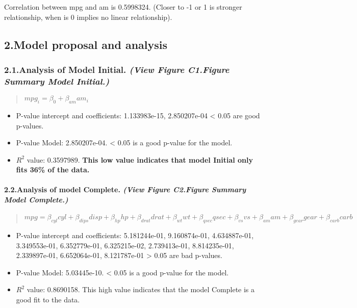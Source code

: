 \documentclass[11pt,]{article}
\begin{document}
Correlation between mpg and am is 0.5998324. (Closer to -1 or 1 is
stronger relationship, when is 0 implies no linear relationship).

\subsection{2.Model proposal and
analysis}\label{model-proposal-and-analysis}

\subsubsection{\texorpdfstring{2.1.Analysis of Model Initial.
\emph{(View Figure C1.Figure Summary Model
Initial.)}}{2.1.Analysis of Model Initial. (View Figure C1.Figure Summary Model Initial.)}}\label{analysis-of-model-initial.-view-figure-c1.figure-summary-model-initial.}

\begin{quote}
\(mpg_i={\beta}_0+\beta_{am}am_i\)
\end{quote}

\begin{itemize}
\itemsep1pt\parskip0pt
\item
  P-value intercept and coefficients: 1.133983e-15, 2.850207e-04
  \textless{} 0.05 are good p-values.
\item
  P-value Model: 2.850207e-04. \textless{} 0.05 is a good p-value for
  the model.
\item
  \(R^2\) value: 0.3597989. \textbf{This low value indicates that model
  Initial only fits 36\% of the data.}
\end{itemize}

\paragraph{\texorpdfstring{2.2.Analysis of model Complete. \emph{(View
Figure C2.Figure Summary Model
Complete.)}}{2.2.Analysis of model Complete. (View Figure C2.Figure Summary Model Complete.)}}\label{analysis-of-model-complete.-view-figure-c2.figure-summary-model-complete.}

\begin{quote}
\(mpg =\beta_{cyl}cyl+\beta_{dips}disp+\beta_{hp}hp+\beta_{drat}drat+\beta_{wt}wt+\beta_{qsec}qsec+\beta_{vs}vs+\beta_{am}am+\beta_{gear}gear+\beta_{carb}carb\)
\end{quote}

\begin{itemize}
\itemsep1pt\parskip0pt
\item
  P-value intercept and coefficients: 5.181244e-01, 9.160874e-01,
  4.634887e-01, 3.349553e-01, 6.352779e-01, 6.325215e-02, 2.739413e-01,
  8.814235e-01, 2.339897e-01, 6.652064e-01, 8.121787e-01 \textgreater{}
  0.05 are bad p-values.
\item
  P-value Model: 5.03445e-10. \textless{} 0.05 is a good p-value for the
  model.
\item
  \(R^2\) value: 0.8690158. This high value indicates that the model
  Complete is a good fit to the data.
\end{itemize}
\end{document}
